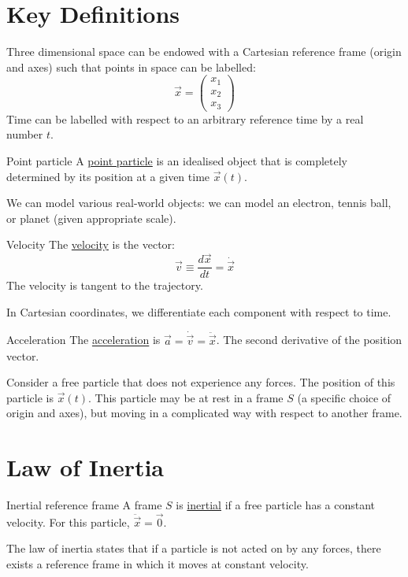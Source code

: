 \documentclass[../Main.tex]{subfiles}
\begin{document}
\section{Key Definitions}
Three dimensional space can be endowed with a Cartesian reference frame (origin and axes) such that points in space can be labelled:
\begin{equation*}
    \vec{x} = \begin{pmatrix}x_1 \\ x_2 \\ x_3\end{pmatrix}
\end{equation*}
Time can be labelled with respect to an arbitrary reference time by a real number $t$.\par
\begin{definition}{Point particle}
    A \underline{point particle} is an idealised object that is completely determined by its position at a given time $\vec{x}(t)$.
\end{definition}
We can model various real-world objects: we can model an electron, tennis ball, or planet (given appropriate scale).
\begin{definition}{Velocity}
    The \underline{velocity} is the vector:
    \begin{equation*}
        \vec{v} \equiv \frac{d\vec{x}}{dt} = \dot{\vec{x}}
    \end{equation*}
    The velocity is tangent to the trajectory.
\end{definition}
In Cartesian coordinates, we differentiate each component with respect to time.
\begin{definition}{Acceleration}
    The \underline{acceleration} is $\vec{a} = \dot{\vec{v}} = \ddot{\vec{x}}$. The second derivative of the position vector.
\end{definition}
Consider a free particle that does not experience any forces. The position of this particle is $\vec{x}(t)$. This particle may be at rest in a frame $S$ (a specific choice of origin and axes), but moving in a complicated way with respect to another frame.
\section{Law of Inertia}
\begin{definition}{Inertial reference frame}
    A frame $S$ is \underline{inertial} if a free particle has a constant velocity. For this particle, $\ddot{\vec{x}} = \vec{0}$.
\end{definition}
The law of inertia states that if a particle is not acted on by any forces, there exists a reference frame in which it moves at constant velocity.
\end{document}

